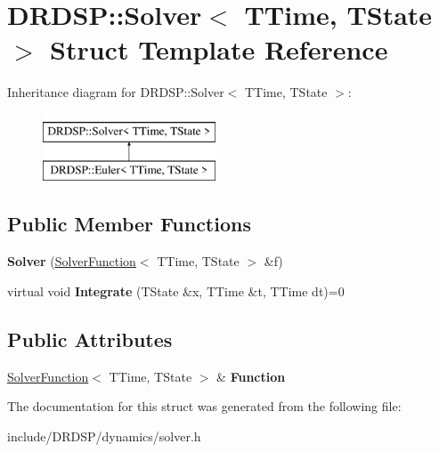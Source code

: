 \hypertarget{struct_d_r_d_s_p_1_1_solver}{\section{D\-R\-D\-S\-P\-:\-:Solver$<$ T\-Time, T\-State $>$ Struct Template Reference}
\label{struct_d_r_d_s_p_1_1_solver}
}
Inheritance diagram for D\-R\-D\-S\-P\-:\-:Solver$<$ T\-Time, T\-State $>$\-:\begin{figure}[H]
\begin{center}
\leavevmode
\includegraphics[height=2.000000cm]{struct_d_r_d_s_p_1_1_solver}
\end{center}
\end{figure}
\subsection*{Public Member Functions}
\begin{DoxyCompactItemize}
\item 
\hypertarget{struct_d_r_d_s_p_1_1_solver_a0e90b6f21779b243987578e2a5c9907a}{{\bfseries Solver} (\hyperlink{struct_d_r_d_s_p_1_1_solver_function}{Solver\-Function}$<$ T\-Time, T\-State $>$ \&f)}\label{struct_d_r_d_s_p_1_1_solver_a0e90b6f21779b243987578e2a5c9907a}

\item 
\hypertarget{struct_d_r_d_s_p_1_1_solver_ac92dbb47d907f32153deb365990b7f89}{virtual void {\bfseries Integrate} (T\-State \&x, T\-Time \&t, T\-Time dt)=0}\label{struct_d_r_d_s_p_1_1_solver_ac92dbb47d907f32153deb365990b7f89}

\end{DoxyCompactItemize}
\subsection*{Public Attributes}
\begin{DoxyCompactItemize}
\item 
\hypertarget{struct_d_r_d_s_p_1_1_solver_ab0322a69134c46c56debe861f8b1f98f}{\hyperlink{struct_d_r_d_s_p_1_1_solver_function}{Solver\-Function}$<$ T\-Time, T\-State $>$ \& {\bfseries Function}}\label{struct_d_r_d_s_p_1_1_solver_ab0322a69134c46c56debe861f8b1f98f}

\end{DoxyCompactItemize}


The documentation for this struct was generated from the following file\-:\begin{DoxyCompactItemize}
\item 
include/\-D\-R\-D\-S\-P/dynamics/solver.\-h\end{DoxyCompactItemize}
